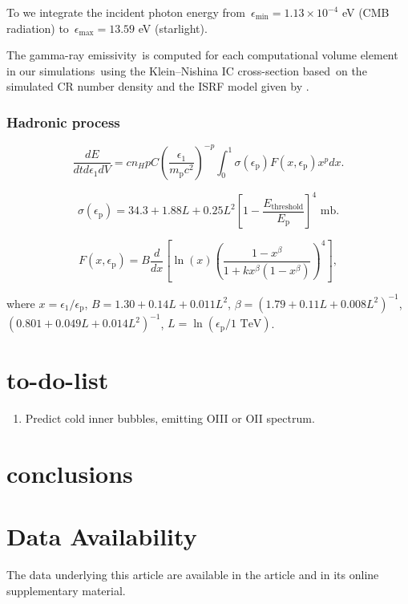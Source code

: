 \documentclass[twocolumn]{aastex631}
\begin{document}
To  we integrate the incident photon energy from\
$\epsilon_{\text{min}}=1.13\times10^{-4}$ eV (CMB radiation) to\
$\epsilon_{\text{max}}=13.59$ eV (starlight).


The gamma-ray emissivity\
is computed for each computational volume element in our simulations\
using the Klein–Nishina IC cross-section \citep{Jones1968} based\
on the simulated CR number density and the ISRF model given by \citet{Porter2017}.


\subsubsection{Hadronic process}

\begin{equation}
  \frac{dE}{dtd\epsilon_{1}dV} = cn_{H}pC\left(\frac{\epsilon_{1}}{m_{\text{p}}c^2}\right)^{-p}\int_{0}^{1}\sigma(\epsilon_{\text{p}}) F(x,\epsilon_{\text{p}}) x^{p}dx.
\end{equation}

\begin{equation}
\sigma(\epsilon_{\text{p}})=34.3+1.88L+0.25L^{2}\left[1-\frac{E_{\text{threshold}}}{E_{\text{p}}}\right]^{4} \text{ mb}.
\end{equation}

\begin{equation}
F(x,\epsilon_{\text{p}})=B\frac{d}{dx}\left[\ln(x)\left(\frac{1-x^{\beta}}{1+kx^{\beta}\left(1-x^{\beta}\right)}\right)^4\right],
\end{equation}


where
$x=\epsilon_{1}/\epsilon_{\text{p}}$, $B=1.30+0.14L+0.011L^2$, $\beta=\left(1.79+0.11L+0.008L^{2}\right)^{-1}$,\
$\left(0.801+0.049L+0.014L^{2}\right)^{-1}$, $L=\ln(\epsilon_{\text{p}}/1 \text{ TeV})$.


\section{to-do-list}
\begin{enumerate}
  \item Predict cold inner bubbles, emitting OIII or OII spectrum.
\end{enumerate}

\section{conclusions}

\section*{Data Availability}
The data underlying this article are available in the article and in its online supplementary material.





\appendix
\end{document}
